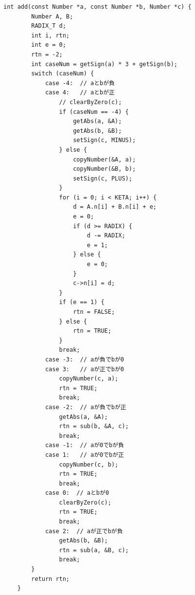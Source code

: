 \documentclass[a4paper,11pt,dvipdfmx]{jsarticle}
\begin{document}
\begin{lstlisting}[caption=\texttt{add}関数,label=lst:addsrc]
    int add(const Number *a, const Number *b, Number *c) {
        Number A, B;
        RADIX_T d;
        int i, rtn;
        int e = 0;
        rtn = -2;
        int caseNum = getSign(a) * 3 + getSign(b);
        switch (caseNum) {
            case -4:  // aとbが負
            case 4:   // aとbが正
                // clearByZero(c);
                if (caseNum == -4) {
                    getAbs(a, &A);
                    getAbs(b, &B);
                    setSign(c, MINUS);
                } else {
                    copyNumber(&A, a);
                    copyNumber(&B, b);
                    setSign(c, PLUS);
                }
                for (i = 0; i < KETA; i++) {
                    d = A.n[i] + B.n[i] + e;
                    e = 0;
                    if (d >= RADIX) {
                        d -= RADIX;
                        e = 1;
                    } else {
                        e = 0;
                    }
                    c->n[i] = d;
                }
                if (e == 1) {
                    rtn = FALSE;
                } else {
                    rtn = TRUE;
                }
                break;
            case -3:  // aが負でbが0
            case 3:   // aが正でbが0
                copyNumber(c, a);
                rtn = TRUE;
                break;
            case -2:  // aが負でbが正
                getAbs(a, &A);
                rtn = sub(b, &A, c);
                break;
            case -1:  // aが0でbが負
            case 1:   // aが0でbが正
                copyNumber(c, b);
                rtn = TRUE;
                break;
            case 0:  // aとbが0
                clearByZero(c);
                rtn = TRUE;
                break;
            case 2:  // aが正でbが負
                getAbs(b, &B);
                rtn = sub(a, &B, c);
                break;
        }
        return rtn;
    }
\end{lstlisting}
\end{document}

